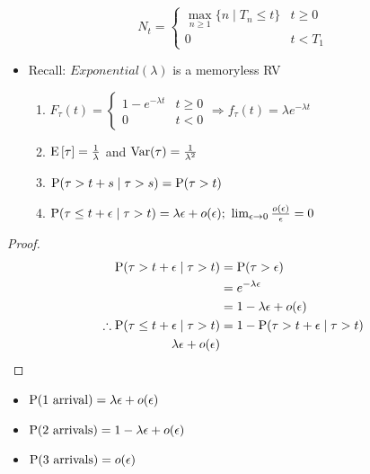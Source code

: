 \begin{definition}

  \begin{displaymath}
    N_t =
    \begin{cases}
      \max_{n \geq 1} \{n \mid T_n \leq t\} & t \geq 0 \\
      0 & t < T_1
    \end{cases}
  \end{displaymath}

\end{definition}

\begin{itemize}
  \item Recall: $Exponential(\lambda)$ is a memoryless RV
    \begin{enumerate}
      \item $F_{\tau}(t) =
        \begin{cases}
          1 - e^{-\lambda t} & t \geq 0 \\
          0 & t < 0
        \end{cases} \Rightarrow f_{\tau}(t) = \lambda e^{-\lambda t}$
      \item $\operatorname{\mathrm{E}}\left[\tau\right] = \frac{1}{\lambda}$ and $\operatorname{\mathrm{Var}}(\tau)
        = \frac{1}{\lambda^2}$
      \item $\operatorname{\mathrm{P}}(\tau > t + s \mid \tau > s) = \operatorname{\mathrm{P}}(\tau > t)$
      \item $\operatorname{\mathrm{P}}(\tau \leq t + \epsilon \mid \tau > t) = \lambda
        \epsilon +o(\epsilon);\ \lim_{\epsilon \rightarrow 0}
        \frac{o(\epsilon)}{\epsilon} = 0$
    \end{enumerate}
\end{itemize}

\begin{proof}

  \begin{align*}
    \operatorname{\mathrm{P}}(\tau > t + \epsilon \mid \tau > t) &= \operatorname{\mathrm{P}}(\tau > \epsilon) \\
    &= e^{-\lambda \epsilon} \\
    &= 1 - \lambda \epsilon + o(\epsilon) \\
    \therefore \operatorname{\mathrm{P}}(\tau \leq t + \epsilon \mid \tau > t ) &= 1 - \operatorname{\mathrm{P}}(\tau
    > t + \epsilon \mid \tau > t) \\
    \lambda \epsilon + o(\epsilon)
  \end{align*}

\end{proof}

\begin{itemize}
  \item $\operatorname{\mathrm{P}}(\text{1 arrival}) = \lambda \epsilon + o(\epsilon)$
  \item $\operatorname{\mathrm{P}}(\text{2 arrivals}) = 1 - \lambda \epsilon + o(\epsilon)$
  \item $\operatorname{\mathrm{P}}(\text{3 arrivals}) = o(\epsilon)$
\end{itemize}

